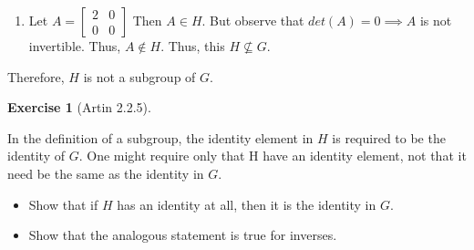 \documentclass[
]{book}
\providecommand{\tightlist}{%
  \setlength{\itemsep}{0pt}\setlength{\parskip}{0pt}}
\theoremstyle{definition}
\theoremstyle{definition}
\theoremstyle{definition}
\newtheorem{exercise}{Exercise}[chapter]
\theoremstyle{definition}
\theoremstyle{remark}
\begin{document}
\begin{enumerate}
\def\labelenumi{(\alph{enumi})}
\setcounter{enumi}{4}
\tightlist
\item
  Let \(A=\begin{bmatrix} 2 & 0 \\ 0 & 0 \end{bmatrix}\) Then \(A\in H\). But observe that \(det(A)=0\implies A\) is not invertible. Thus, \(A\not\in H\). Thus, this \(H \not\subseteq G\).
\end{enumerate}

Therefore, \(H\) is not a subgroup of \(G\).

\begin{exercise}[Artin 2.2.5]
\protect\hypertarget{exr:unnamed-chunk-94}{}\label{exr:unnamed-chunk-94}

In the definition of a subgroup, the identity element in \(H\) is required to be the identity
of \(G\). One might require only that H have an identity element, not that it need be the
same as the identity in \(G\).

\begin{itemize}
\tightlist
\item
  Show that if \(H\) has an identity at all, then it is the identity in \(G\).
\item
  Show that the analogous statement is true for inverses.
\end{itemize}

\end{exercise}
\end{document}
